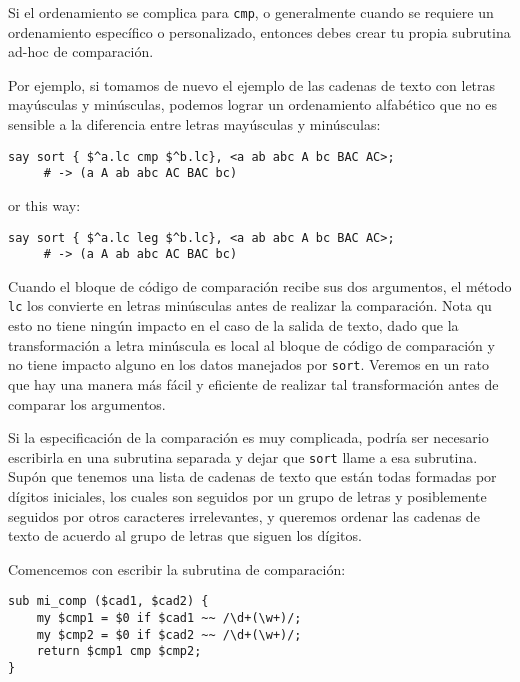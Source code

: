 Si el ordenamiento se complica para {\tt cmp}, o generalmente
cuando se requiere un ordenamiento específico o personalizado,
entonces debes crear tu propia subrutina ad-hoc de comparación.

Por ejemplo, si tomamos de nuevo el ejemplo de las cadenas
de texto con letras mayúsculas y minúsculas, podemos lograr un
ordenamiento alfabético que no es sensible a la diferencia
entre letras mayúsculas y minúsculas:

\begin{verbatim}
say sort { $^a.lc cmp $^b.lc}, <a ab abc A bc BAC AC>;
     # -> (a A ab abc AC BAC bc)
\end{verbatim}

or this way:
\begin{verbatim}
say sort { $^a.lc leg $^b.lc}, <a ab abc A bc BAC AC>;
     # -> (a A ab abc AC BAC bc)
\end{verbatim}

Cuando el bloque de código de comparación recibe sus dos 
argumentos, el método {\tt lc} los convierte en letras
minúsculas antes de realizar la comparación. Nota qu esto
no tiene ningún impacto en el caso de la salida de texto,
dado que la transformación a letra minúscula es local
al bloque de código de comparación y no tiene impacto
alguno en los datos manejados por {\tt sort}. Veremos
en un rato que hay una manera más fácil y eficiente de
realizar tal transformación antes de comparar los argumentos.

Si la especificación de la comparación es muy complicada,
podría ser necesario escribirla en una subrutina separada
y dejar que {\tt sort} llame a esa subrutina. Supón que 
tenemos una lista de cadenas de texto que están todas formadas
por dígitos iniciales, los cuales son seguidos por un grupo
de letras y posiblemente seguidos por otros caracteres irrelevantes,
y queremos ordenar las cadenas de texto de acuerdo al grupo de
letras que siguen los dígitos.

Comencemos con escribir la subrutina de comparación:


\begin{verbatim}
sub mi_comp ($cad1, $cad2) {
    my $cmp1 = $0 if $cad1 ~~ /\d+(\w+)/; 
    my $cmp2 = $0 if $cad2 ~~ /\d+(\w+)/; 
    return $cmp1 cmp $cmp2;
}
\end{verbatim}

